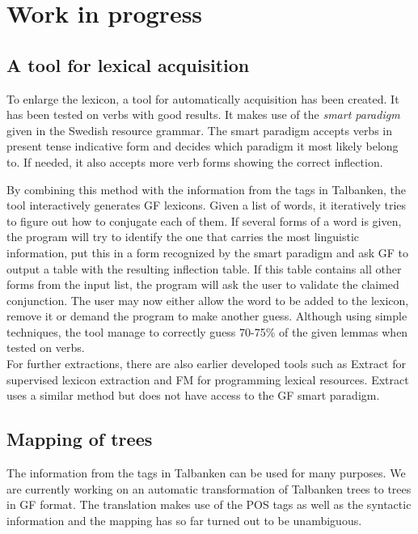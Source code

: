 \documentclass[submission]{eptcs} %
\begin{document}
\section{Work in progress}
\subsection{A tool for lexical acquisition}

To enlarge the lexicon, 
a tool for automatically acquisition has been created. It has 
been tested on verbs with good results. It makes use of
the \emph{smart paradigm} given in the Swedish resource grammar.
The smart paradigm accepts verbs in present tense indicative form and decides
 which paradigm it most likely belong to. If needed, it also accepts more
verb forms showing the correct inflection.

By combining this method with the information from the tags in Talbanken,
the tool interactively generates GF lexicons. 
Given a list of words, it iteratively
tries to figure out how to conjugate each of them. If several forms of a word is 
given, the program will try to identify the one that carries the most linguistic
information, put this in a form recognized by the smart paradigm and ask GF to output
a table with the resulting inflection table. 
If this table contains all other forms from the input list,
the program will ask the  user to
validate the claimed conjunction. The user may now either
allow the word to be added to the lexicon, remove it or demand the program
to make another guess.
Although using simple techniques, the tool 
manage to correctly guess 70-75\% of the given lemmas when tested on
verbs. \\
For further extractions, there are also earlier developed tools such as
Extract\cite{extract} for supervised lexicon extraction and
FM\cite{fm} for programming lexical resources. Extract uses a similar 
method but does not have access to the GF smart paradigm. 



\subsection{Mapping of trees}
The information from the tags in Talbanken can be used for many purposes.
We are currently working on an automatic transformation of Talbanken trees 
to trees in GF format. The translation makes use of the POS tags as well as
the syntactic information and the mapping has so far turned out to be unambiguous. 
\end{document}
